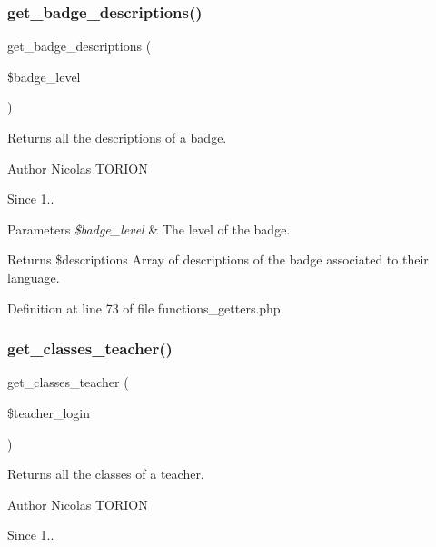 \subsubsection{\texorpdfstring{get\+\_\+badge\+\_\+descriptions()}{get\_badge\_descriptions()}}
{\footnotesize\ttfamily get\+\_\+badge\+\_\+descriptions (\begin{DoxyParamCaption}\item[{}]{\$badge\+\_\+level }\end{DoxyParamCaption})}

Returns all the descriptions of a badge.

\begin{DoxyAuthor}{Author}
Nicolas T\+O\+R\+I\+ON 
\end{DoxyAuthor}
\begin{DoxySince}{Since}
1.. 
\end{DoxySince}

\begin{DoxyParams}{Parameters}
{\em \$badge\+\_\+level} & The level of the badge. \\
\hline
\end{DoxyParams}
\begin{DoxyReturn}{Returns}
\$descriptions Array of descriptions of the badge associated to their language. 
\end{DoxyReturn}


Definition at line 73 of file functions\+\_\+getters.\+php.

\mbox{\label{functions__getters_8php_a1535d2e27e19b7ad8820f6b37c546f60}} 
\subsubsection{\texorpdfstring{get\+\_\+classes\+\_\+teacher()}{get\_classes\_teacher()}}
{\footnotesize\ttfamily get\+\_\+classes\+\_\+teacher (\begin{DoxyParamCaption}\item[{}]{\$teacher\+\_\+login }\end{DoxyParamCaption})}

Returns all the classes of a teacher.

\begin{DoxyAuthor}{Author}
Nicolas T\+O\+R\+I\+ON 
\end{DoxyAuthor}
\begin{DoxySince}{Since}
1.. 
\end{DoxySince}


